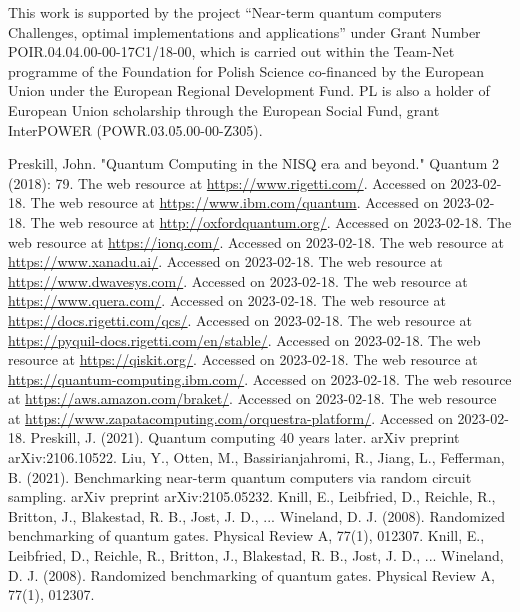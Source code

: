 \documentclass[preprint,12pt, a4paper, dvipsnames]{elsarticle}
\newcommand{\1}{{\rm 1\hspace{-0.9mm}l}}
\theoremstyle{definition}
\begin{document}
This work is  supported by
the project “Near-term quantum computers Challenges, optimal implementations and applications” under Grant Number POIR.04.04.00-00-17C1/18-00, which is carried out within the Team-Net programme of the Foundation for Polish Science co-financed by the European Union under the European Regional Development Fund.
PL is also a holder of European Union scholarship through the European Social Fund,
grant InterPOWER (POWR.03.05.00-00-Z305).


\begin{thebibliography}{00}
 Preskill, John. "Quantum Computing in the NISQ era and beyond." Quantum 2 (2018): 79.
 The web resource at \url{https://www.rigetti.com/}. Accessed on 2023-02-18.
 The web resource at \url{https://www.ibm.com/quantum}. Accessed on 2023-02-18.
 The web resource at \url{http://oxfordquantum.org/}. Accessed on 2023-02-18.
 The web resource at \url{https://ionq.com/}. Accessed on 2023-02-18.
 The web resource at \url{https://www.xanadu.ai/}. Accessed on 2023-02-18.
 The web resource at \url{https://www.dwavesys.com/}. Accessed on 2023-02-18.
 The web resource at \url{https://www.quera.com/}. Accessed on 2023-02-18.
 The web resource at \url{https://docs.rigetti.com/qcs/}. Accessed on 2023-02-18.
 The web resource at \url{https://pyquil-docs.rigetti.com/en/stable/}. Accessed on 2023-02-18.
 The web resource at \url{https://qiskit.org/}. Accessed on 2023-02-18.
 The web resource at \url{https://quantum-computing.ibm.com/}. Accessed on 2023-02-18.
 The web resource at \url{https://aws.amazon.com/braket/}. Accessed on 2023-02-18.
 The web resource at \url{https://www.zapatacomputing.com/orquestra-platform/}. Accessed on 2023-02-18.
 Preskill, J. (2021). Quantum computing 40 years later. arXiv preprint arXiv:2106.10522.
 	Liu, Y., Otten, M., Bassirianjahromi, R., Jiang, L.,  Fefferman, B. (2021). Benchmarking near-term quantum computers via random circuit sampling. arXiv preprint arXiv:2105.05232.
 Knill, E., Leibfried, D., Reichle, R., Britton, J., Blakestad, R. B., Jost, J. D., ... Wineland, D. J. (2008). Randomized benchmarking of quantum gates. Physical Review A, 77(1), 012307.
Knill, E., Leibfried, D., Reichle, R., Britton, J., Blakestad, R. B., Jost, J. D., ...  Wineland, D. J. (2008). Randomized benchmarking of quantum gates. Physical Review A, 77(1), 012307.

\end{thebibliography}
\end{document}
